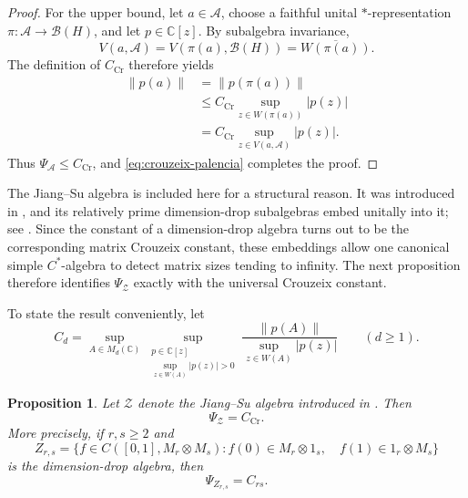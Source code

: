 \documentclass[10pt,a4paper]{amsart}
\newtheorem{proposition}[theorem]{Proposition}
\newcommand{\C}{\mathbb C}
\newcommand{\calA}{\mathcal A}
\newcommand{\calB}{\mathcal B}
\begin{document}
\begin{proof}
For the upper bound, let \(a\in\calA\), choose a faithful unital
\(*\)-representation \(\pi:\calA\to\calB(H)\), and let \(p\in\C[z]\).  By
subalgebra invariance,
\[
       V(a,\calA)=V(\pi(a),\calB(H))=\overline{W(\pi(a))}.
\]
The definition of \(C_{\mathrm{Cr}}\) therefore yields
\[
\begin{split}
       \|p(a)\|
       &=\|p(\pi(a))\|\\
       &\leqslant C_{\mathrm{Cr}}
          \sup_{z\in W(\pi(a))}|p(z)|\\
       &=C_{\mathrm{Cr}}
          \sup_{z\in V(a,\calA)}|p(z)|.
\end{split}
\]
Thus \(\Psi_{\calA}\leqslant C_{\mathrm{Cr}}\), and
\eqref{eq:crouzeix-palencia} completes the proof.
\end{proof}


The Jiang--Su algebra is included here for a structural reason.  It was
introduced in \cite{JiangSu}, and its relatively prime dimension-drop
subalgebras embed unitally into it; see
\cite[Theorem~2.2 and Proposition~3.3]{RordamWinter}.  Since the constant of
a dimension-drop algebra turns out to be the corresponding matrix Crouzeix
constant, these embeddings allow one canonical simple \(C^*\)-algebra to
detect matrix sizes tending to infinity.  The next proposition therefore
identifies \(\Psi_{\mathcal Z}\) exactly with the universal Crouzeix constant.

To state the result conveniently, let
\[
       C_d=
       \sup_{A\in M_d(\C)}
       \sup_{\substack{p\in\C[z]\\
               \sup_{z\in W(A)}|p(z)|>0}}
       \frac{\|p(A)\|}{\sup_{z\in W(A)}|p(z)|}
       \qquad(d\geqslant1).
\]

\begin{proposition}\label{prop:jiang-su}
Let \(\mathcal Z\) denote the Jiang--Su algebra introduced in
\cite{JiangSu}.  Then
\[
       \Psi_{\mathcal Z}=C_{\mathrm{Cr}}.
\]
More precisely, if \(r,s\geqslant2\) and
\[
 Z_{r,s}=\bigl\{f\in C([0,1],M_r\otimes M_s):
 f(0)\in M_r\otimes1_s,\quad f(1)\in1_r\otimes M_s\bigr\}
\]
is the dimension-drop algebra, then
\[
       \Psi_{Z_{r,s}}=C_{rs}.
\]
\end{proposition}
\end{document}
